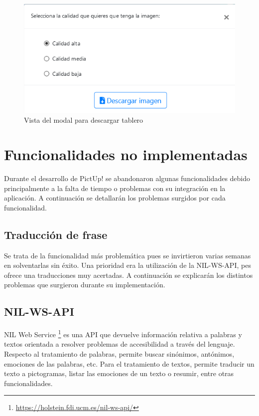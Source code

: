 \begin{figure}[h!]
	\centering
	\includegraphics[width=0.7\linewidth]{Imagenes/Bitmap/modalDescargarTablero}
	\caption{Vista del modal para descargar tablero}
	\label{fig:modaldescargartablero}
\end{figure}



\section{Funcionalidades no implementadas}
Durante el desarrollo de PictUp! se abandonaron algunas funcionalidades debido principalmente a la falta de tiempo o problemas con su integración en la aplicación. A continuación se detallarán los problemas surgidos por cada funcionalidad. 


\subsection{Traducción de frase}
Se trata de la funcionalidad más problemática pues se invirtieron varias semanas en solventarlas sin éxito. Una prioridad era la utilización de la NIL-WS-API, pes ofrece una traducciones muy acertadas. A continuación se explicarán los distintos problemas que surgieron durante su implementación.  

\subsection{NIL-WS-API}
\label{cap5:sec:nilgroup}

NIL Web Service \footnote{\url{https://holstein.fdi.ucm.es/nil-ws-api/}} es una API que devuelve información relativa a palabras y textos orientada a resolver problemas de accesibilidad a través del lenguaje. Respecto al tratamiento de palabras, permite buscar sinónimos, antónimos, emociones de las palabras, etc. Para el tratamiento de textos, permite  traducir un texto a pictogramas, listar las emociones de un texto o resumir, entre otras funcionalidades. 

